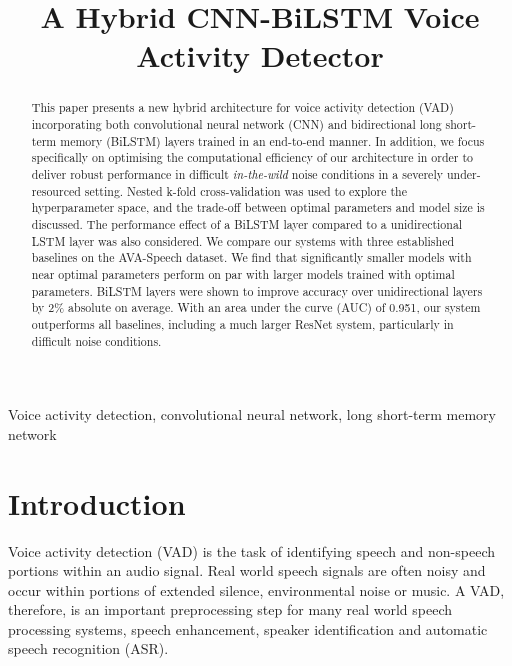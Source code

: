 \documentclass{article}
\title{A Hybrid CNN-BiLSTM Voice Activity Detector}
\begin{document}
\maketitle
\thispagestyle{firstpage}
\newpage

\begin{abstract}
This paper presents a new hybrid architecture for voice activity detection (VAD) incorporating both convolutional neural network (CNN) and bidirectional long short-term memory (BiLSTM) layers trained in an end-to-end manner.
In addition, we focus specifically on optimising the computational efficiency of our architecture in order to deliver robust performance in difficult \textit{in-the-wild} noise conditions in a severely under-resourced setting.
Nested k-fold cross-validation was used to explore the hyperparameter space, and the trade-off between optimal parameters and model size is discussed.
The performance effect of a BiLSTM layer compared to a unidirectional LSTM layer was also considered.
We compare our systems with three established baselines on the AVA-Speech dataset.
We find that significantly smaller models with near optimal parameters perform on par with larger models trained with optimal parameters.
BiLSTM layers were shown to improve accuracy over unidirectional layers by 2\% absolute on average.
With an area under the curve (AUC) of 0.951, our system outperforms all baselines, including a much larger ResNet system, particularly in difficult noise conditions.
\end{abstract}

\begin{keywords}
Voice activity detection, convolutional neural network, long short-term memory network
\end{keywords}



\section{Introduction}
\label{sec:intro}

\vspace{-2mm}

Voice activity detection (VAD) is the task of identifying speech and non-speech portions within an audio signal.
Real world speech signals are often noisy and occur within portions of extended silence, environmental noise or music.
A VAD, therefore, is an important preprocessing step for many real world speech processing systems, speech enhancement, speaker identification and automatic speech recognition (ASR).
\end{document}
